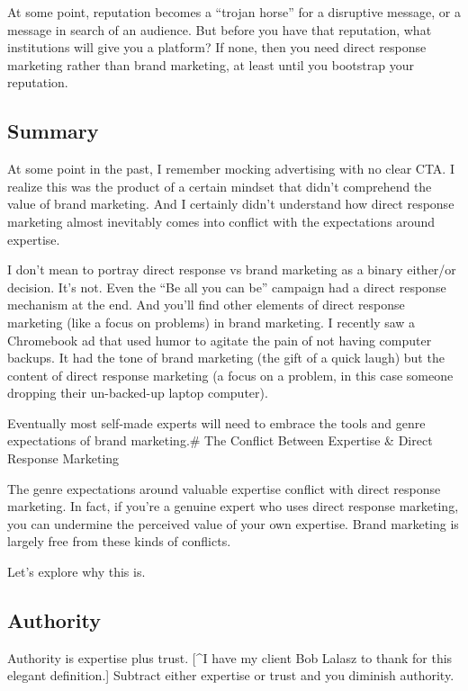 \documentclass[13pt,]{tufte-handout}
\begin{document}
At some point, reputation becomes a ``trojan horse'' for a disruptive
message, or a message in search of an audience. But before you have that
reputation, what institutions will give you a platform? If none, then
you need direct response marketing rather than brand marketing, at least
until you bootstrap your reputation.

\hypertarget{summary-1}{%
\subsection{Summary}\label{summary-1}}

At some point in the past, I remember mocking advertising with no clear
CTA. I realize this was the product of a certain mindset that didn't
comprehend the value of brand marketing. And I certainly didn't
understand how direct response marketing almost inevitably comes into
conflict with the expectations around expertise.

I don't mean to portray direct response vs brand marketing as a binary
either/or decision. It's not. Even the ``Be all you can be'' campaign
had a direct response mechanism at the end. And you'll find other
elements of direct response marketing (like a focus on problems) in
brand marketing. I recently saw a Chromebook ad that used humor to
agitate the pain of not having computer backups. It had the tone of
brand marketing (the gift of a quick laugh) but the content of direct
response marketing (a focus on a problem, in this case someone dropping
their un-backed-up laptop computer).

Eventually most self-made experts will need to embrace the tools and
genre expectations of brand marketing.\# The Conflict Between Expertise
\& Direct Response Marketing

The genre expectations around valuable expertise conflict with direct
response marketing. In fact, if you're a genuine expert who uses direct
response marketing, you can undermine the perceived value of your own
expertise. Brand marketing is largely free from these kinds of
conflicts.

Let's explore why this is.

\hypertarget{authority}{%
\subsection{Authority}\label{authority}}

Authority is expertise plus trust. {[}\^{}I have my client Bob Lalasz to
thank for this elegant definition.{]} Subtract either expertise or trust
and you diminish authority.
\end{document}
